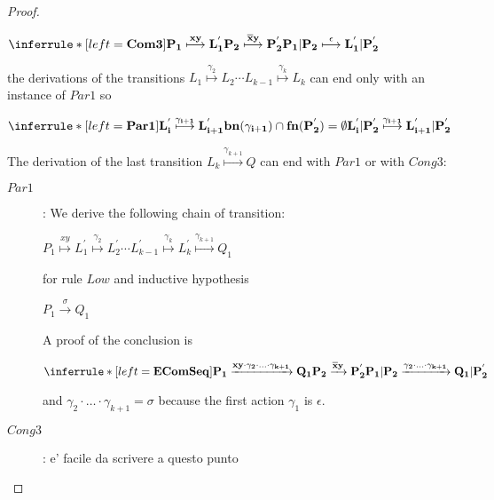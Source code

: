 \begin{proposition}
\begin{proof}
\begin{description}
		\begin{center}
		  $\inferrule* [left=\bf{Com3}]{
		      P_{1} \stackrel{xy}{\longmapsto} L_{1}^{'}
		    \\
		      P_{2} \stackrel{\overline{x}y}{\longmapsto} P_{2}^{'}
		  }{
		    P_{1}|P_{2} \stackrel{\epsilon}{\longmapsto} L_{1}^{'}|P_{2}^{'}
		  }$ 		      
		\end{center}
		the derivations of the transitions $L_{1} \stackrel{\gamma_{2}}{\longmapsto} L_{2} \cdots L_{k-1} \stackrel{\gamma_{k}}{\longmapsto} L_{k}$ can end only with an instance of $Par1$ so 
		\begin{center}
		  $\inferrule* [left=\bf{Par1}]{
		      L_{i}^{'} \stackrel{\gamma_{i+1}}{\longmapsto} L_{i+1}^{'}
		    \\
		      bn(\gamma_{i+1})\cap fn(P_{2}^{'})=\emptyset
		  }{
		    L_{i}^{'}|P_{2}^{'} \stackrel{\gamma_{i+1}}{\longmapsto} L_{i+1}^{'}|P_{2}^{'}
		  }$ 		      		  
		\end{center}
		The derivation of the last transition $L_{k}\stackrel{\gamma_{k+1}}{\longmapsto} Q$ can end with $Par1$ or with $Cong3$:
		\begin{description}
		  \item[$Par1$]:
		    We derive the following chain of transition:
		    \begin{center}
		      $P_{1} \stackrel{xy}{\longmapsto} L_{1}^{'} \stackrel{\gamma_{2}}{\longmapsto} L_{2}^{'} \cdots L_{k-1}^{'} \stackrel{\gamma_{k}}{\longmapsto} L_{k}^{'}\stackrel{\gamma_{k+1}}{\longmapsto} Q_{1}$
		    \end{center}
		    for rule $Low$ and inductive hypothesis
		    \begin{center}
		      $P_{1} \xrightarrow{\sigma} Q_{1}$ 
		    \end{center}
		    A proof of the conclusion is
		    \begin{center}
		      $\inferrule* [left=\bf{EComSeq}]{
			  P_{1} \xrightarrow{xy \cdot \gamma_{2}\cdot \ldots \cdot \gamma_{k+1}} Q_{1}
			\\
			  P_{2}\xrightarrow{\overline{x}y} P_{2}^{'}
		      }{
			P_{1}|P_{2} \xrightarrow{\gamma_{2}\cdot \ldots \cdot \gamma_{k+1}} Q_{1}|P_{2}^{'}
		      }$ 
		    \end{center}
		    and $\gamma_{2}\cdot \ldots \cdot \gamma_{k+1}=\sigma$ because the first action $\gamma_{1}$ is $\epsilon$.
		  \item[$Cong3$]: e' facile da scrivere a questo punto
		    

\end{description}
\end{description}
\end{proof}
\end{proposition}
